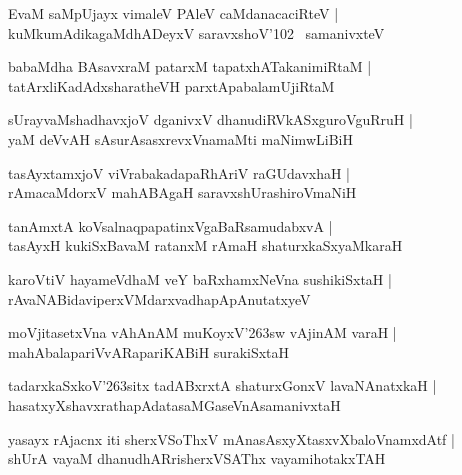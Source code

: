 \documentclass[twoside,12pt,openright]{book}
\def\S{\char'263}
\newcounter{shloka}[chapter]
\begin{document}
\begin{shloka}%
EvaM saMpUjayx vimaleV PAleV caMdanacaciRteV |\\
kuMkumAdikagaMdhADeyxV saravxshoV\char'102 ~samanivxteV
\end{shloka}

\begin{shloka}%
babaMdha BAsavxraM patarxM tapatxhATakanimiRtaM |\\
tatArxliKadAdxsharatheVH parxtApabalamUjiRtaM 
\end{shloka}

\begin{shloka}%
sUrayvaMshadhavxjoV dganivxV dhanudiRVkASxguroVguRruH |\\
yaM deVvAH sAsurAsasxrevxVnamaMti maNimwLiBiH
\end{shloka}

\begin{shloka}%
tasAyxtamxjoV viVrabakadapaRhAriV raGUdavxhaH |\\
rAmacaMdorxV mahABAgaH saravxshUrashiroVmaNiH
\end{shloka}

\begin{shloka}%
tanAmxtA koVsalnaqpapatinxVgaBaRsamudabxvA |\\
tasAyxH kukiSxBavaM ratanxM rAmaH shaturxkaSxyaMkaraH 
\end{shloka}

\begin{shloka}%
karoVtiV hayameVdhaM veY baRxhamxNeVna sushikiSxtaH |\\
rAvaNABidaviperxVMdarxvadhapApAnutatxyeV
\end{shloka}

\begin{shloka}%
moVjitasetxVna vAhAnAM muKoyxV\S sw vAjinAM varaH |\\
mahAbalapariVvARapariKABiH surakiSxtaH 
\end{shloka}

\begin{shloka}%
tadarxkaSxkoV\S sitx tadABxrxtA shaturxGonxV lavaNAnatxkaH |\\
hasatxyXshavxrathapAdatasaMGaseVnAsamanivxtaH
\end{shloka}

\begin{shloka}%
yasayx rAjacnx iti sherxVSoThxV mAnasAsxyXtasxvXbaloVnamxdAtf |\\
shUrA vayaM dhanudhARrisherxVSAThx vayamihotakxTAH 
\end{shloka}
\end{document}
